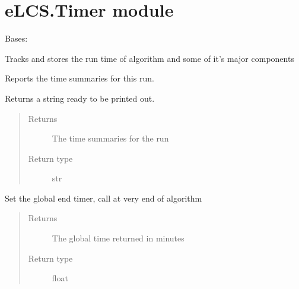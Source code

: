 \documentclass[letterpaper,10pt,english]{sphinxmanual}
\begin{document}
\section{eLCS.Timer module}
\label{\detokenize{eLCS:module-eLCS.Timer}}\label{\detokenize{eLCS:elcs-timer-module}}

\begin{fulllineitems}
\label{\detokenize{eLCS:eLCS.Timer.Timer}}
Bases: 

Tracks and stores the run time of algorithm and some of it’s major components

\begin{fulllineitems}
\label{\detokenize{eLCS:eLCS.Timer.Timer.reportTimes}}
Reports the time summaries for this run.

Returns a string ready to be printed out.
\begin{quote}\begin{description}
\item[{Returns}] \leavevmode
The time summaries for the run

\item[{Return type}] \leavevmode
str

\end{description}\end{quote}

\end{fulllineitems}


\begin{fulllineitems}
\label{\detokenize{eLCS:eLCS.Timer.Timer.returnGlobalTimer}}
Set the global end timer, call at very end of algorithm
\begin{quote}\begin{description}
\item[{Returns}] \leavevmode
The global time returned in minutes

\item[{Return type}] \leavevmode
float

\end{description}\end{quote}


\end{fulllineitems}
\end{fulllineitems}
\end{document}
